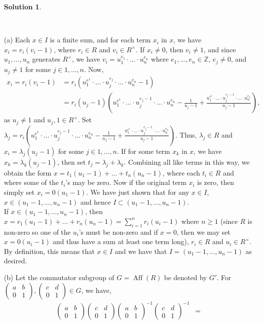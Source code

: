 \documentclass[10pt]{article}
\newcommand{\ZZ}{\mathbb Z}
\newcommand{\Aff}{\operatorname{Aff}}
\theoremstyle{Theorem}
\theoremstyle{definition}
\newtheorem{sol}{Solution}
\theoremstyle{remark}
\theoremstyle{custom}
\begin{document}
\begin{sol}
\begin{description}~
\item{(a)} Each $x\in I$ is a finite sum, and for each term $x_i$ in $x$, we have $x_i=r_i(v_i-1)$, where $r_i\in R$ and $v_i\in R^\times$. If $x_i\not= 0$, then $v_i\not=1$, and since $u_1,...,u_n$ generates $R^\times$, we have $v_i=u_1^{e_1}\cdot ...\cdot u_n^{e_n}$ where $e_1,...,e_n\in \ZZ$, $e_j\not= 0$, and $u_j\not= 1$ for some $j\in 1,...,n$. Now,
\begin{align*}
 x_i=r_i(v_i-1)&=r_i(u_1^{e^1}\cdot ...\cdot u_j^{e_j}\cdot ...\cdot u_n^{e_n}-1) \\
  & = r_i(u_j-1)(u_1^{e^1}\cdot ...\cdot u_j^{e_j-1}\cdot ...\cdot u_n^{e_n}-\frac{1}{u_j-1}+\frac{u_1^{e^1}\cdot ...\cdot u_j^{e_j-1}\cdot ...\cdot u_n^{e_n}}{u_j-1}),
\end{align*}
as $u_j\not= 1$ and $u_j,1\in R^\times$. Set $\lambda_j=r_i(u_1^{e^1}\cdot ...\cdot u_j^{e_j-1}\cdot ...\cdot u_n^{e_n}-\frac{1}{u_j-1}+\frac{u_1^{e^1}\cdot ...\cdot u_j^{e_j-1}\cdot ...\cdot u_n^{e_n}}{u_j-1})$. Thus, $\lambda_j\in R$ and $x_i=\lambda_j (u_j-1)$ for some $j\in 1,...,n$. If for some term $x_k$ in $x$, we have $x_k=\lambda_k(u_j-1)$, then set $t_j=\lambda_j+\lambda_k$. Combining all like terms in this way, we obtain the form $x=t_1(u_1-1)+...+t_n (u_n-1)$, where each $t_i\in R$ and where some of the $t_i$'s may be zero. Now if the original term $x_i$ is zero, then simply set $x_i=0(u_1-1)$. We have just shown that for any $x\in I$, $x\in (u_1-1,...,u_n-1)$ and hence $I\subset  (u_1-1,...,u_n-1)$. \\
If $x\in (u_1-1,...,u_n-1)$, then $x=r_1(u_1-1)+...+r_n(u_n-1)=\sum_{i=1}^n r_i(u_i-1)$ where $n \geq 1$ (since $R $ is non-zero so one of the $u_i$'s must be non-zero and if $x=0$, then we may set $x=0(u_i-1)$ and thus have a sum at least one term long), $r_i \in R$ and $u_i \in R^\times$. By definition, this means that $x\in I$ and we have that $I = (u_1 - 1, \dots, u_n - 1)$ as desired. 
\item{(b)} Let the commutator subgroup of $G=\Aff (R)$ be denoted by $G'$. For $(\begin{smallmatrix}a&b\\0&1\end{smallmatrix}),(\begin{smallmatrix}c&d\\0&1\end{smallmatrix})\in G$, we have, 
\begin{align*}
 (\begin{smallmatrix}a&b\\0&1\end{smallmatrix})(\begin{smallmatrix}c&d\\0&1\end{smallmatrix})(\begin{smallmatrix}a&b\\0&1\end{smallmatrix})^{-1}(\begin{smallmatrix}c&d\\0&1\end{smallmatrix})^{-1} &=

\end{align*}
\end{description}
\end{sol}
\end{document}
